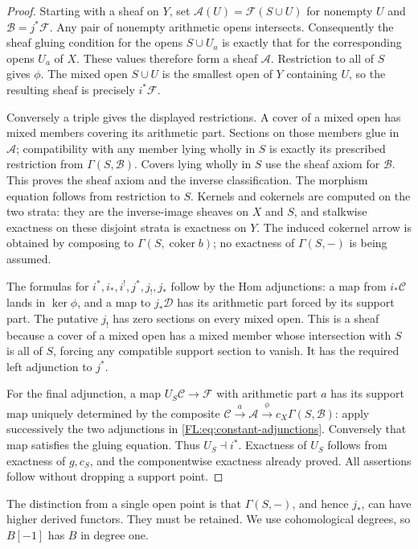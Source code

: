 \documentclass[11pt,a4paper]{article}
\theoremstyle{definition}\newtheorem{definition}[theorem]{Definition}
\providecommand{\coker}{\operatorname{coker}}
\begin{document}
\begin{proof}
Starting with a sheaf on $Y$, set
$\mathcal A(U)=\mathcal F(S\cup U)$ for nonempty $U$ and
$\mathcal B=j^*\mathcal F$. Any pair of nonempty arithmetic opens
intersects. Consequently the sheaf gluing condition for the opens
$S\cup U_a$ is exactly that for the corresponding opens $U_a$ of $X$.
These values therefore form a sheaf $\mathcal A$. Restriction to all
of $S$ gives $\phi$. The mixed open $S\cup U$ is the smallest open
of $Y$ containing $U$, so the resulting sheaf is precisely $i^*\mathcal F$.

Conversely a triple gives the displayed restrictions. A cover of a
mixed open has mixed members covering its arithmetic part. Sections
on those members glue in $\mathcal A$; compatibility with any member
lying wholly in $S$ is exactly its prescribed restriction from
$\Gamma(S,\mathcal B)$. Covers lying wholly in $S$ use the sheaf
axiom for $\mathcal B$. This proves the sheaf axiom and the inverse
classification. The morphism equation follows from restriction to
$S$. Kernels and cokernels are computed on the two strata: they are
the inverse-image sheaves on $X$ and $S$, and stalkwise exactness on
these disjoint strata is exactness on $Y$. The induced cokernel arrow
is obtained by composing to $\Gamma(S,\coker b)$; no exactness of
$\Gamma(S,-)$ is being assumed.

The formulas for $i^*,i_*,i^!,j^*,j_!,j_*$ follow by the Hom
adjunctions: a map from $i_*\mathcal C$ lands in $\ker\phi$, and a
map to $j_*\mathcal D$ has its arithmetic part forced by its support
part. The putative $j_!$ has zero sections on every mixed open. This
is a sheaf because a cover of a mixed open has a mixed member whose
intersection with $S$ is all of $S$, forcing any compatible support
section to vanish. It has the required left adjunction to $j^*$.

For the final adjunction, a map $U_S\mathcal C\to\mathcal F$ with
arithmetic part $a$ has its support map uniquely determined by the
composite $\mathcal C\xrightarrow a\mathcal A\xrightarrow\phi
c_X\Gamma(S,\mathcal B)$: apply successively the two adjunctions in
\eqref{FL:eq:constant-adjunctions}. Conversely that map satisfies the
gluing equation. Thus $U_S\dashv i^*$. Exactness of $U_S$ follows
from exactness of $g,c_S$, and the componentwise exactness already
proved. All assertions follow without dropping a support point.
\end{proof}

The distinction from a single open point is that $\Gamma(S,-)$, and
hence $j_*$, can have higher derived functors. They must be retained.
We use cohomological degrees, so $B[-1]$ has $B$ in degree one.
\end{document}
